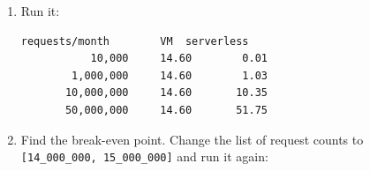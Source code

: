 \begin{enumerate}
\begin{codeblock}
\begin{Shaded}
\begin{Highlighting}[]
\NormalTok{(}\SpecialCharTok{\{}\SpecialStringTok{ }\SpecialCharTok{\{}\SpecialStringTok{ }\SpecialCharTok{\{}\NormalTok{)}
\NormalTok{ [}\NormalTok{, }\NormalTok{, }\NormalTok{, }\NormalTok{]:}
    \NormalTok{(}\SpecialCharTok{\{}\SpecialStringTok{ }\SpecialCharTok{\{}
          \SpecialCharTok{\{}\NormalTok{)}
\end{Highlighting}
\end{Shaded}

  \end{codeblock}

  A GB-second is one gigabyte of memory held for one second, the usual way serverless work is measured.
\item
  Run it:

  \begin{codeblock}

\begin{Shaded}
\begin{Highlighting}[]
\KeywordTok{\&\&} 
\end{Highlighting}
\end{Shaded}

  \end{codeblock}

  \begin{codeblock}
  \begin{Verbatim}[formatcom=\outputstyle]
   requests/month        VM  serverless
           10,000     14.60        0.01
        1,000,000     14.60        1.03
       10,000,000     14.60       10.35
       50,000,000     14.60       51.75
  \end{Verbatim}
  \end{codeblock}
\item
  Find the break-even point. Change the list of request counts to \texttt{{[}14\_}\allowbreak{}\texttt{000\_}\allowbreak{}\texttt{000,}\allowbreak{}\texttt{\ 15\_}\allowbreak{}\texttt{000\_}\allowbreak{}\texttt{000{]}} and run it again:


\end{enumerate}
